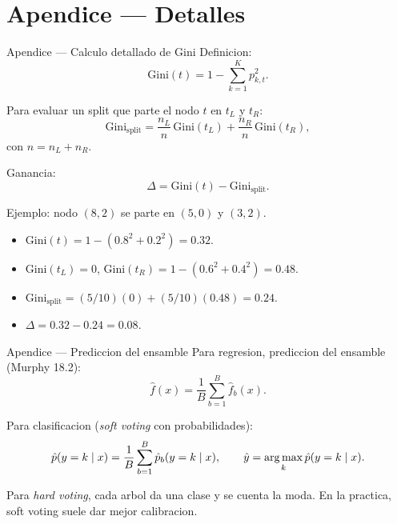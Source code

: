 \section[Apendice]{Apendice — Detalles\label{sec:apendice-w15}}

\begin{frame}{Apendice — Calculo detallado de Gini}
Definicion:
\[
\mathrm{Gini}(t) = 1 - \sum_{k=1}^K p_{k,t}^2.
\]

\vspace{0.2em}
Para evaluar un split que parte el nodo $t$ en $t_L$ y $t_R$:
\[
\mathrm{Gini}_{\text{split}} = \frac{n_L}{n}\,\mathrm{Gini}(t_L) + \frac{n_R}{n}\,\mathrm{Gini}(t_R),
\]
con $n = n_L + n_R$.

\vspace{0.2em}
Ganancia:
\[
\Delta = \mathrm{Gini}(t) - \mathrm{Gini}_{\text{split}}.
\]

\vspace{0.3em}
Ejemplo: nodo $(8, 2)$ se parte en $(5, 0)$ y $(3, 2)$.
\begin{itemize}\footnotesize
  \item $\mathrm{Gini}(t) = 1 - (0.8^2 + 0.2^2) = 0.32$.
  \item $\mathrm{Gini}(t_L) = 0$, $\mathrm{Gini}(t_R) = 1 - (0.6^2 + 0.4^2) = 0.48$.
  \item $\mathrm{Gini}_{\text{split}} = (5/10)(0) + (5/10)(0.48) = 0.24$.
  \item $\Delta = 0.32 - 0.24 = 0.08$.
\end{itemize}
\end{frame}

\begin{frame}{Apendice — Prediccion del ensamble}
Para regresion, prediccion del ensamble (Murphy 18.2):
\[
\hat f(x) = \frac{1}{B}\sum_{b=1}^{B} \hat f_b(x).
\]

\vspace{0.3em}
Para clasificacion (\textit{soft voting} con probabilidades):
\[
\hat p(y=k\mid x) = \frac{1}{B}\sum_{b=1}^{B} \hat p_b(y=k\mid x),
\qquad
\hat y = \argmax_{k}\hat p(y=k\mid x).
\]

\vspace{0.3em}
{\footnotesize Para \textit{hard voting}, cada arbol da una clase y se cuenta la moda. En la practica, soft voting suele dar mejor calibracion.}
\end{frame}

